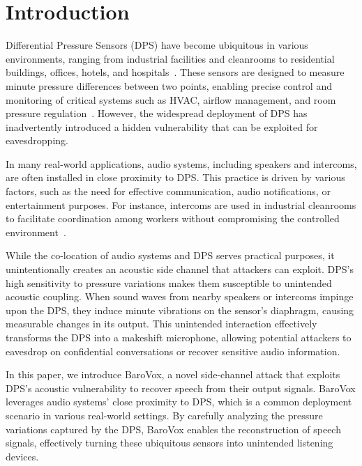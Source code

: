 \section{Introduction}
Differential Pressure Sensors (DPS) have become ubiquitous in various environments, ranging from industrial facilities and cleanrooms to residential buildings, offices, hotels, and hospitals~\cite{avnet2024pressure, standard2004cleanrooms, datasheetsdp}. These sensors are designed to measure minute pressure differences between two points, enabling precise control and monitoring of critical systems such as HVAC, airflow management, and room pressure regulation~\cite{bradford_hvac_2024, standard2004cleanrooms}. 
However, the widespread deployment of DPS has inadvertently introduced a hidden vulnerability that can be exploited for eavesdropping.

In many real-world applications, audio systems, including speakers and intercoms, are often installed in close proximity to DPS. This practice is driven by various factors, such as the need for effective communication, audio notifications, or entertainment purposes. For instance, intercoms are used in industrial cleanrooms to facilitate coordination among workers without compromising the controlled environment~\cite{standard2004cleanrooms}. 

While the co-location of audio systems and DPS serves practical purposes, it unintentionally creates an acoustic side channel that attackers can exploit. DPS's high sensitivity to pressure variations makes them susceptible to unintended acoustic coupling. When sound waves from nearby speakers or intercoms impinge upon the DPS, they induce minute vibrations on the sensor's diaphragm, causing measurable changes in its output. This unintended interaction effectively transforms the DPS into a makeshift microphone, allowing potential attackers to eavesdrop on confidential conversations or recover sensitive audio information.

In this paper, we introduce BaroVox, a novel side-channel attack that exploits DPS's acoustic vulnerability to recover speech from their output signals. BaroVox leverages audio systems' close proximity to DPS, which is a common deployment scenario in various real-world settings. By carefully analyzing the pressure variations captured by the DPS, BaroVox enables the reconstruction of speech signals, effectively turning these ubiquitous sensors into unintended listening devices.


